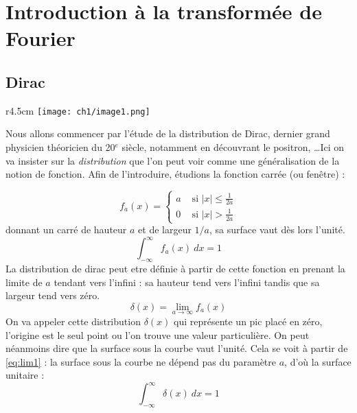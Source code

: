 \chapter{Introduction à la transformée de Fourier}
\section{Dirac}
\begin{wrapfigure}[15]{r}{4.5cm}
\vspace{-5mm}
\texttt{[image: ch1/image1.png]}
\end{wrapfigure}
Nous allons commencer par l'étude de la distribution de Dirac, dernier grand 
physicien théoricien du 20$^e$ siècle, notamment en découvrant le positron, 
\dots Ici on va insister sur la \textit{distribution} que l'on peut voir comme 
une généralisation de la notion de fonction. Afin de l'introduire, étudions la 
fonction carrée (ou fenêtre) :


\begin{equation}
f_a(x) =\left\{\begin{array}{ll}
a &\text{ si } |x| \leq \frac{1}{2a}\\
0 &\text{ si } |x| > \frac{1}{2a}
\end{array}\right.
\end{equation}
donnant un carré de hauteur $a$ et de largeur $1/a$, sa surface vaut dès lors 
l'unité. 
\begin{equation}
\int_{-\infty}^\infty f_a(x)\ dx = 1
\label{eq:lim1}
\end{equation}
La distribution de dirac peut etre définie à partir de cette fonction 
en prenant la limite de $a$ tendant vers l'infini : sa hauteur tend vers 
l'infini tandis que sa largeur tend vers zéro.
\begin{equation}
\delta(x) = \lim\limits_{a\rightarrow\infty} f_a(x)
\end{equation}
On va appeler cette distribution $\delta(x)$ qui représente un pic placé en 
zéro, l'origine est le seul point ou l'on trouve une valeur particulière. On 
peut néanmoins dire que la surface sous la courbe vaut l'unité. Cela se 
voit à partir de \autoref{eq:lim1} : la surface sous la courbe ne dépend pas 
du paramètre $a$, d'où la surface unitaire :
\begin{equation}
\int_{-\infty}^\infty \delta(x)\ dx = 1
\end{equation}

